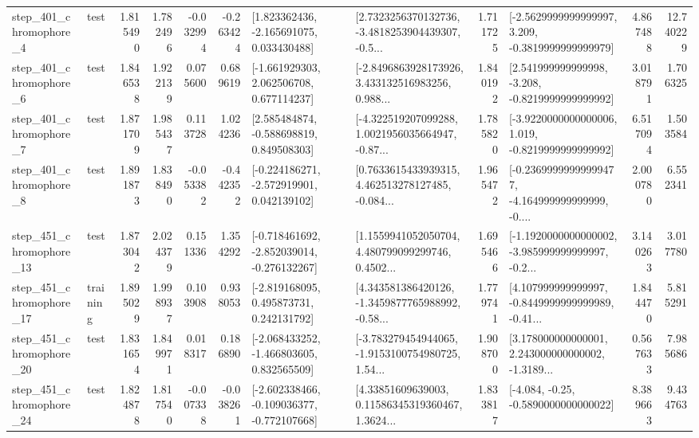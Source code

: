 \begin{tabular}{llrrrrllrlrr}
   step\_401\_chromophore\_4 &      test &      1.815490 &    1.782496 &     -0.032994 & -0.263424 &    [1.823362436, -2.165691075, 0.033430488] &  [2.7323256370132736, -3.4818253904439307, -0.5... &       1.711725 &  [-2.5629999999999997, 3.209, -0.3819999999999979] &            4.867488 &         12.740229 \\
   step\_401\_chromophore\_6 &      test &      1.846538 &    1.922139 &      0.075600 &  0.689619 &    [-1.661929303, 2.062506708, 0.677114237] &  [-2.8496863928173926, 3.433132516983256, 0.988... &       1.840192 &   [2.541999999999998, -3.208, -0.8219999999999992] &            3.018791 &          1.706325 \\
   step\_401\_chromophore\_7 &      test &      1.871709 &    1.985437 &      0.113728 &  1.024236 &    [2.585484874, -0.588698819, 0.849508303] &  [-4.322519207099288, 1.0021956035664947, -0.87... &       1.785820 &  [-3.9220000000000006, 1.019, -0.8219999999999992] &            6.517094 &          1.503584 \\
   step\_401\_chromophore\_8 &      test &      1.891873 &    1.838490 &     -0.053382 & -0.442352 &   [-0.224186271, -2.572919901, 0.042139102] &  [0.7633615433939315, 4.462513278127485, -0.084... &       1.965472 &  [-0.23699999999999477, -4.164999999999999, -0.... &            2.000780 &          6.552341 \\
  step\_451\_chromophore\_13 &      test &      1.873042 &    2.024379 &      0.151336 &  1.354292 &  [-0.718461692, -2.852039014, -0.276132267] &  [1.1559941052050704, 4.480799099299746, 0.4502... &       1.695466 &  [-1.1920000000000002, -3.985999999999997, -0.2... &            3.140263 &          3.017780 \\
  step\_451\_chromophore\_17 &  training &      1.895029 &    1.998937 &      0.103908 &  0.938053 &    [-2.819168095, 0.495873731, 0.242131792] &  [4.343581386420126, -1.3459877765988992, -0.58... &       1.779741 &  [4.107999999999997, -0.8449999999999989, -0.41... &            1.844470 &          5.815291 \\
  step\_451\_chromophore\_20 &      test &      1.831654 &    1.849971 &      0.018317 &  0.186890 &   [-2.068433252, -1.466803605, 0.832565509] &  [-3.783279454944065, -1.9153100754980725, 1.54... &       1.908700 &  [3.178000000000001, 2.243000000000002, -1.3189... &            0.567633 &          7.985686 \\
  step\_451\_chromophore\_24 &      test &      1.824878 &    1.817540 &     -0.007338 & -0.038261 &  [-2.602338466, -0.109036377, -0.772107668] &  [4.33851609639003, 0.11586345319360467, 1.3624... &       1.833817 &               [-4.084, -0.25, -0.5890000000000022] &            8.389663 &          9.434763 \\

\end{tabular}
